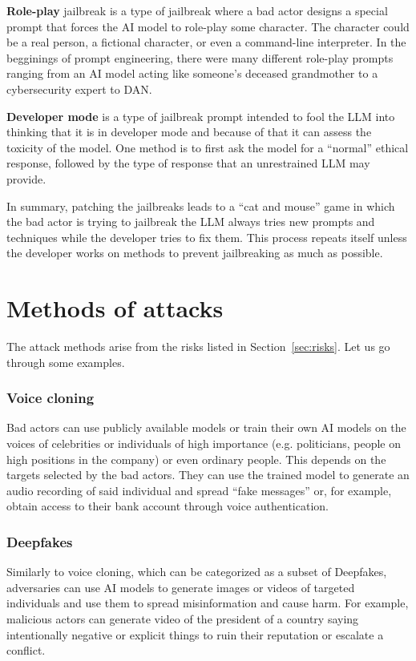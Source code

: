 \textbf{Role-play} jailbreak is a type of jailbreak where a bad actor designs a special prompt that forces the AI model to role-play some character. The character could be a real person, a fictional character, or even a command-line interpreter. In the begginings of prompt engineering, there were many different role-play prompts ranging from an AI model acting like someone's deceased grandmother to a cybersecurity expert to DAN.

\textbf{Developer mode} is a type of jailbreak prompt intended to fool the LLM into thinking that it is in developer mode and because of that it can assess the toxicity of the model. One method is to first ask the model for a ``normal'' ethical response, followed by the type of response that an unrestrained LLM may provide.

In summary, patching the jailbreaks leads to a ``cat and mouse'' game in which the bad actor is trying to jailbreak the LLM always tries new prompts and techniques while the developer tries to fix them. This process repeats itself unless the developer works on methods to prevent jailbreaking as much as possible.

\section{Methods of attacks\label{sec:methods_of_attacks}}
The attack methods arise from the risks listed in Section~\ref{sec:risks}. Let us go through some examples.

\subsubsection*{Voice cloning}

Bad actors can use publicly available models or train their own AI models on the voices of celebrities or individuals of high importance (e.g. politicians, people on high positions in the company) or even ordinary people. This depends on the targets selected by the bad actors. They can use the trained model to generate an audio recording of said individual and spread ``fake messages'' or, for example, obtain access to their bank account through voice authentication.

\subsubsection*{Deepfakes}

Similarly to voice cloning, which can be categorized as a subset of Deepfakes, adversaries can use AI models to generate images or videos of targeted individuals and use them to spread misinformation and cause harm. For example, malicious actors can generate video of the president of a country saying intentionally negative or explicit things to ruin their reputation or escalate a conflict.

